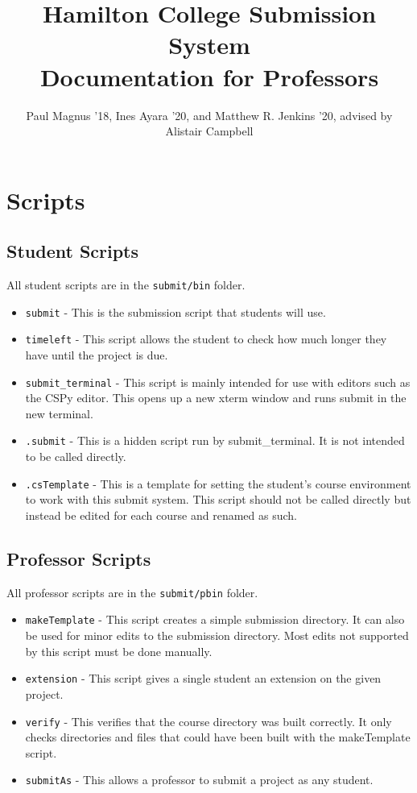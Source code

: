 \documentclass{article}
\begin{document}
\title{Hamilton College Submission System\\Documentation for Professors}
\author{Paul Magnus '18, Ines Ayara '20, and Matthew R. Jenkins '20, advised by Alistair Campbell}
\date{}
\maketitle{}

\section{Scripts}
\subsection{Student Scripts}
All student scripts are in the \verb|submit/bin| folder.
\begin{itemize}
\item \verb|submit| - This is the submission script that students will use.

\item \verb|timeleft| - This script allows the student to check how much longer they have until the project is due.

\item \verb|submit_terminal| - This script is mainly intended for use with editors such as the CSPy editor. This opens up a new xterm window and runs submit in the new terminal.

\item \verb|.submit| - This is a hidden script run by submit\_terminal. It is not intended to be called directly.

\item \verb|.csTemplate| - This is a template for setting the student's course environment to work with this submit system. This script should not be called directly but instead be edited for each course and renamed as such.

\end{itemize}

\subsection{Professor Scripts}
All professor scripts are in the \verb|submit/pbin| folder.
\begin{itemize}
\item \verb|makeTemplate| - This script creates a simple submission directory. It can also be used for minor edits to the submission directory. Most edits not supported by this script must be done manually.

\item \verb|extension| - This script gives a single student an extension on the given project.

\item \verb|verify| - This verifies that the course directory was built correctly. It only checks directories and files that could have been built with the makeTemplate script.

\item \verb|submitAs| - This allows a professor to submit a project as any student.
\end{itemize}
\pagebreak
\end{document}
